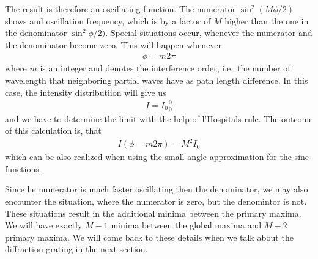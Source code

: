 \documentclass[letterpaper,10pt,english]{sphinxmanual}
\begin{document}
The result is therefore an oscillating function. The numerator \(\sin^2(M\phi/2)\) shows and oscillation frequency, which is by a factor of \(M\) higher than the one in the denominator \(\sin^2\phi/2)\). Special situations occur, whenever the numerator and the denominator become zero. This will happen whenever
\begin{equation*}
\begin{split}\phi=m 2\pi\end{split}
\end{equation*}
where \(m\) is an integer and denotes the interference order, i.e. the number of wavelength that neighboring partial waves have as path length difference. In this case, the intensity distributiion will give us
\begin{equation*}
\begin{split}I=I_0 \frac{0}{0}\end{split}
\end{equation*}
and we have to determine the limit with the help of l’Hospitals rule. The outcome of this calculation is, that
\begin{equation*}
\begin{split}I(\phi=m2\pi)=M^2 I_0\end{split}
\end{equation*}
which can be also realized when using the small angle approximation for the sine functions.

Since he numerator is much faster oscillating then the denominator, we may also encounter the situation, where the numerator is zero, but the denomintor is not. These situations result in the additional minima between the primary maxima. We will have exactly \(M-1\) minima between the global maxima and \(M-2\) primary maxima. We will come back to these details when we talk about the diffraction grating in the next section.
\end{document}
